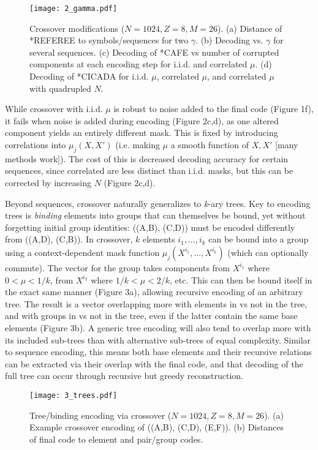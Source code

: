 \documentclass{article}
\begin{document}
\begin{figure}
\label{fig:2}
  \centering
  \texttt{[image: 2\_gamma.pdf]}
  \caption{Crossover modifications ($N=1024, Z=8, M=26$). (a) Distance of *REFEREE to symbols/sequences for two $\gamma$. (b) Decoding vs. $\gamma$ for several sequences. (c) Decoding of *CAFE vs number of corrupted components at each encoding step for i.i.d. and correlated $\mu$. (d) Decoding of *CICADA for i.i.d. $\mu$, correlated $\mu$, and correlated $\mu$ with quadrupled $N$.}
\end{figure}

While crossover with i.i.d. $\mu$ is robust to noise added to the final code (Figure 1f), it fails when noise is added during encoding (Figure 2c,d), as one altered component yields an entirely different mask. This is fixed by introducing correlations into $\mu_j(X, X')$ (i.e. making $\mu$ a smooth function of $X, X'$ [many methods work]). The cost of this is decreased decoding accuracy for certain sequences, since correlated are less distinct than i.i.d. masks, but this can be corrected by increasing $N$ (Figure 2c,d).

Beyond sequences, crossover naturally generalizes to \textit{k}-ary trees. Key to encoding trees is \textit{binding} elements into groups that can themselves be bound, yet without forgetting initial group identities: ((A,B), (C,D)) must be encoded differently from ((A,D), (C,B)). In crossover, $k$ elements $i_1, ..., i_k$ can be bound into a group using a context-dependent mask function $\mu_j(X^{i_1}, ..., X^{i_k})$ (which can optionally commute). The vector for the group takes components from $X^{i_1}$ where $0 < \mu < 1/k$, from $X^{i_2}$ where $1/k < \mu < 2/k$, etc. This can then be bound itself in the exact same manner (Figure 3a), allowing recursive encoding of an arbitrary tree. The result is a vector overlapping more with elements in vs not in the tree, and with groups in vs not in the tree, even if the latter contain the same base elements (Figure 3b). A generic tree encoding will also tend to overlap more with its included sub-trees than with alternative sub-trees of equal complexity. Similar to sequence encoding, this means both base elements and their recursive relations can be extracted via their overlap with the final code, and that decoding of the full tree can occur through recursive but greedy reconstruction.

\begin{figure}
\label{fig:3}
  \centering
  \texttt{[image: 3\_trees.pdf]}
  \caption{Tree/binding encoding via crossover ($N=1024, Z=8, M=26$). (a) Example crossover encoding of ((A,B), (C,D), (E,F)). (b) Distances of final code to element and pair/group codes.}
\end{figure}
\end{document}
